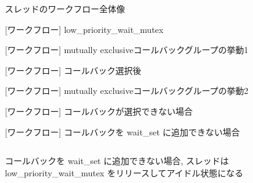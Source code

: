 \begin{frame}{スレッドのワークフロー全体像}
\end{frame}

\begin{frame}{[ワークフロー] low\_priority\_wait\_mutex}
\end{frame}

\begin{frame}{[ワークフロー] mutually exclusiveコールバックグループの挙動1}
\end{frame}

\begin{frame}{[ワークフロー] コールバック選択後}
\end{frame}

\begin{frame}{[ワークフロー] mutually exclusiveコールバックグループの挙動2}
\end{frame}


\begin{frame}{[ワークフロー] コールバックが選択できない場合}
\end{frame}

\begin{frame}{[ワークフロー] コールバックを wait\_set に追加できない場合}
    \begin{columns}
        \begin{column}{0.4\textwidth}
            コールバックを wait\_set に追加できない場合, スレッドは low\_priority\_wait\_mutex をリリースしてアイドル状態になる
        \end{column}
        \begin{column}{0.6\textwidth}
        \end{column}
    \end{columns}
\end{frame}
